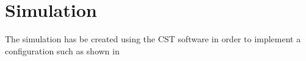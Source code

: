 \section{\textsf{Simulation}}
    The simulation has be created using the CST software in order to implement a configuration such as shown in \cite{zhang_design_2023}